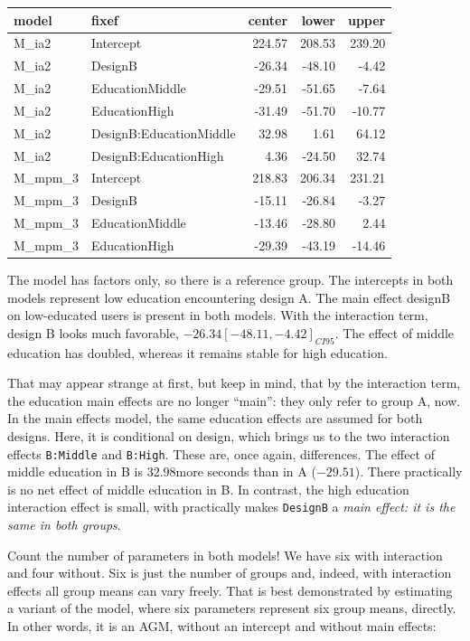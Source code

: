 \documentclass[]{svmono}
\newenvironment{Shaded}{\begin{snugshade}}{\end{snugshade}}
\newcommand{\KeywordTok}[1]{\textcolor[rgb]{0.13,0.29,0.53}{\textbf{#1}}}
\newcommand{\DataTypeTok}[1]{\textcolor[rgb]{0.13,0.29,0.53}{#1}}
\newcommand{\DecValTok}[1]{\textcolor[rgb]{0.00,0.00,0.81}{#1}}
\newcommand{\StringTok}[1]{\textcolor[rgb]{0.31,0.60,0.02}{#1}}
\newcommand{\CommentTok}[1]{\textcolor[rgb]{0.56,0.35,0.01}{\textit{#1}}}
\newcommand{\OperatorTok}[1]{\textcolor[rgb]{0.81,0.36,0.00}{\textbf{#1}}}
\newcommand{\NormalTok}[1]{#1}
\theoremstyle{definition}
\theoremstyle{definition}
\theoremstyle{definition}
\theoremstyle{remark}
\begin{document}
\begin{longtable}[]{@{}llrrr@{}}
\toprule
model & fixef & center & lower & upper\tabularnewline
\midrule
\endhead
M\_ia2 & Intercept & 224.57 & 208.53 & 239.20\tabularnewline
M\_ia2 & DesignB & -26.34 & -48.10 & -4.42\tabularnewline
M\_ia2 & EducationMiddle & -29.51 & -51.65 & -7.64\tabularnewline
M\_ia2 & EducationHigh & -31.49 & -51.70 & -10.77\tabularnewline
M\_ia2 & DesignB:EducationMiddle & 32.98 & 1.61 & 64.12\tabularnewline
M\_ia2 & DesignB:EducationHigh & 4.36 & -24.50 & 32.74\tabularnewline
M\_mpm\_3 & Intercept & 218.83 & 206.34 & 231.21\tabularnewline
M\_mpm\_3 & DesignB & -15.11 & -26.84 & -3.27\tabularnewline
M\_mpm\_3 & EducationMiddle & -13.46 & -28.80 & 2.44\tabularnewline
M\_mpm\_3 & EducationHigh & -29.39 & -43.19 & -14.46\tabularnewline
\bottomrule
\end{longtable}

The model has factors only, so there is a reference group. The
intercepts in both models represent low education encountering design A.
The main effect designB on low-educated users is present in both models.
With the interaction term, design B looks much favorable,
\(-26.34 [-48.11, -4.42]_{CI95}\). The effect of middle education has
doubled, whereas it remains stable for high education.

That may appear strange at first, but keep in mind, that by the
interaction term, the education main effects are no longer ``main'':
they only refer to group A, now. In the main effects model, the same
education effects are assumed for both designs. Here, it is conditional
on design, which brings us to the two interaction effects
\texttt{B:Middle} and \texttt{B:High}. These are, once again,
differences. The effect of middle education in B is \(32.98\)more
seconds than in A (\(-29.51\)). There practically is no net effect of
middle education in B. In contrast, the high education interaction
effect is small, with practically makes \texttt{DesignB} a \emph{main
effect: it is the same in both groups}.

Count the number of parameters in both models! We have six with
interaction and four without. Six is just the number of groups and,
indeed, with interaction effects all group means can vary freely. That
is best demonstrated by estimating a variant of the model, where six
parameters represent six group means, directly. In other words, it is an
AGM, without an intercept and without main effects:

\begin{Shaded}
\end{Shaded}
\end{document}
